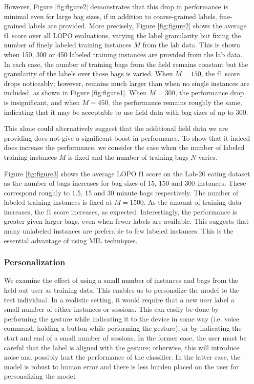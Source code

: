 \documentclass{sigchi}
\begin{document}
However, Figure \ref{fig:figure2} demonstrates that this drop in performance is minimal even for large bag sizes, if in addition to coarse-grained labels, fine-grained labels are provided. More precisely, Figure \ref{fig:figure2} shows the average f1 score over all LOPO evaluations, varying the label granularity but fixing the number of finely labeled training instances $M$ from the lab data. This is shown when 150, 300 or 450 labeled training instances are provided from the lab data. In each case, the number of training bags from the field remains constant but the granularity of the labels over those bags is varied. When $M = 150$, the f1 score drops noticeably; however, remains much larger than when no single instances are included, as shown in Figure \ref{fig:figure1}. When $M = 300$, the performance drop is insignificant, and when $M = 450$, the performance remains roughly the same, indicating that it may be acceptable to use field data with bag sizes of up to 300.

This alone could alternatively suggest that the additional field data we are providing does not give a significant boost in performance. To show that it indeed does increase the performance, we consider the case when the number of labeled training instances $M$ is fixed and the number of training bags $N$ varies.

Figure \ref{fig:figure3} shows the average LOPO f1 score on the Lab-20 eating dataset as the number of bags increases for bag sizes of 15, 150 and 300 instances. These correspond roughly to 1.5, 15 and 30 minute bags respectively. The number of labeled training instances is fixed at $M = 1500$. As the amount of training data increases, the f1 score increases, as expected. Interestingly, the performance is greater given larger bags, even when fewer labels are available. This suggests that many unlabeled instances are preferable to few labeled instances. This is the essential advantage of using MIL techniques.

\subsubsection{Personalization}

We examine the effect of using a small number of instances and bags from the held-out user as training data. This enables us to personalize the model to the test individual. In a realistic setting, it would require that a new user label a small number of either instances or sessions. This can easily be done by performing the gesture while indicating it to the device in some way (i.e. voice command, holding a button while performing the gesture), or by indicating the start and end of a small number of sessions. In the former case, the user must be careful that the label is aligned with the gesture; otherwise, this will introduce noise and possibly hurt the performance of the classifier. In the latter case, the model is robust to human error and there is less burden placed on the user for personalizing the model.
\end{document}
